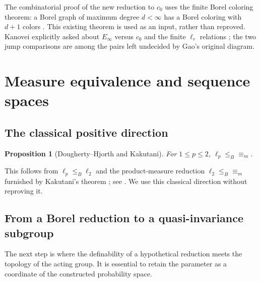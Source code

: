 \documentclass[11pt]{article}
\numberwithin{equation}{section}
\newtheorem{proposition}[theorem]{Proposition}
\theoremstyle{definition}
\begin{document}
The combinatorial proof of the new reduction to $c_0$ uses the finite
Borel coloring theorem: a Borel graph of maximum degree $d<\infty$
has a Borel coloring with $d+1$ colors
\cite[Proposition~4.6]{KST}.  This existing theorem is used as an
input, rather than reproved.  Kanovei explicitly asked about
$E_\infty$ versus $c_0$ and the finite $\ell_r$ relations
\cite[Question~4.7, p.~28]{Kanovei}; the two jump comparisons are
among the pairs left undecided by Gao's original diagram.


\section{Measure equivalence and sequence spaces}\label{sec:sequence-measure}
\subsection{The classical positive direction}
\begin{proposition}[Dougherty--Hjorth and Kakutani]\label{prop:positive}
For $1\leq p\leq2$, $\ell_p\leq_B{\equiv_m}$.
\end{proposition}
This follows from $\ell_p\leq_B\ell_2$ \cite{DH} and the
product-measure reduction $\ell_2\leq_B{\equiv_m}$ furnished by
Kakutani's theorem \cite{Kakutani}; see \cite[Section~8.5]{Gao}.
We use this classical direction without reproving it.

\subsection{From a Borel reduction to a quasi-invariance subgroup}
The next step is where the definability of a hypothetical reduction meets
the topology of the acting group. It is essential to retain the parameter
as a coordinate of the constructed probability space.
\end{document}
